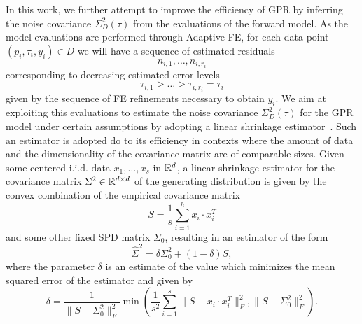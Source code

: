 In this work, we further attempt to improve the efficiency of GPR by inferring the noise covariance $\Sigma^2_D(\tau)$ from the evaluations of the forward model.\newline
As the model evaluations are performed through Adaptive FE, for each data point $(p_i, \tau_i, y_i) \in D$ we will have a sequence of estimated residuals 
\begin{equation}\label{eq:eval-seq}
     n_{i,1}, \dots, n_{i,r_i}
\end{equation} 
    corresponding to decreasing estimated error levels 
\begin{equation} \label{eq:tol-seq}
        \tau_{i,1} > \dots > \tau_{i,r_i} = \tau_i
\end{equation}
given by the sequence of FE refinements necessary to obtain $y_i$.
We aim at exploiting this evaluations to estimate the noise covariance $\Sigma^2_D(\tau)$ for the GPR model under certain assumptions by adopting a linear shrinkage estimator~\cite{LedoitWolf2004b}. 
Such an estimator is adopted do to its efficiency in contexts where the amount of data and the dimensionality of the covariance matrix are of comparable sizes. \newline
Given some centered i.i.d. data $x_1,\dots, x_s$ in $\mathbb{R}^d$, a linear shrinkage estimator for the covariance matrix $\Sigma^2 \in \mathbb{R}^{d\times d}$ of the generating distribution is given by the convex combination of the empirical covariance matrix \[
S = \frac{1}{s} \sum_{i=1}^h x_i \cdot x_i^T
\] 
and some other fixed SPD matrix $\Sigma_0$, resulting in an estimator of the form
\begin{equation}\label{eq:shrinkage-estimator-gen}
    \hat \Sigma^2 = \delta \Sigma^2_0 + (1-\delta) S,
\end{equation}
where the parameter $\delta$ is an estimate of the value which minimizes the mean squared error of the estimator and given by 
\begin{equation} \label{eq:shrinkage-delta}
    \delta = \frac{1}{\big \|S - \Sigma^2_0 \big \|_F^2} \min \left( \frac{1}{s^2} \sum_{i=1}^{s} \big \|S - x_i \cdot x_i^T\big \|_F^2, \big \|S - \Sigma^2_0 \big\|_F^2 \right).
\end{equation}\medbreak

